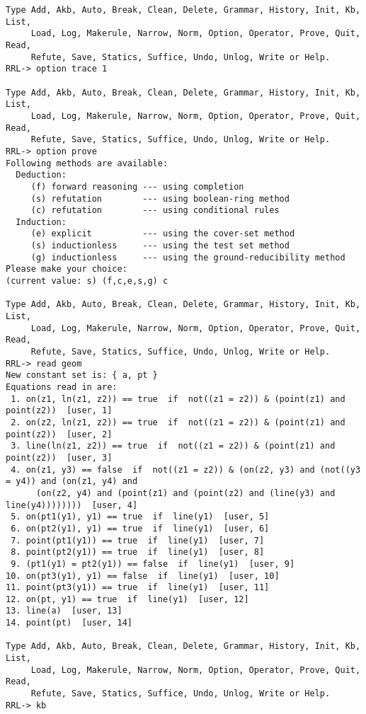 \begin{verbatim}
Type Add, Akb, Auto, Break, Clean, Delete, Grammar, History, Init, Kb, List,
     Load, Log, Makerule, Narrow, Norm, Option, Operator, Prove, Quit, Read,
     Refute, Save, Statics, Suffice, Undo, Unlog, Write or Help.
RRL-> option trace 1

Type Add, Akb, Auto, Break, Clean, Delete, Grammar, History, Init, Kb, List,
     Load, Log, Makerule, Narrow, Norm, Option, Operator, Prove, Quit, Read,
     Refute, Save, Statics, Suffice, Undo, Unlog, Write or Help.
RRL-> option prove 
Following methods are available:
  Deduction:
     (f) forward reasoning --- using completion
     (s) refutation        --- using boolean-ring method
     (c) refutation        --- using conditional rules
  Induction:
     (e) explicit          --- using the cover-set method
     (s) inductionless     --- using the test set method
     (g) inductionless     --- using the ground-reducibility method
Please make your choice: 
(current value: s) (f,c,e,s,g) c

Type Add, Akb, Auto, Break, Clean, Delete, Grammar, History, Init, Kb, List,
     Load, Log, Makerule, Narrow, Norm, Option, Operator, Prove, Quit, Read,
     Refute, Save, Statics, Suffice, Undo, Unlog, Write or Help.
RRL-> read geom
New constant set is: { a, pt }
Equations read in are:
 1. on(z1, ln(z1, z2)) == true  if  not((z1 = z2)) & (point(z1) and point(z2))  [user, 1]
 2. on(z2, ln(z1, z2)) == true  if  not((z1 = z2)) & (point(z1) and point(z2))  [user, 2]
 3. line(ln(z1, z2)) == true  if  not((z1 = z2)) & (point(z1) and point(z2))  [user, 3]
 4. on(z1, y3) == false  if  not((z1 = z2)) & (on(z2, y3) and (not((y3 = y4)) and (on(z1, y4) and 
      (on(z2, y4) and (point(z1) and (point(z2) and (line(y3) and line(y4))))))))  [user, 4]
 5. on(pt1(y1), y1) == true  if  line(y1)  [user, 5]
 6. on(pt2(y1), y1) == true  if  line(y1)  [user, 6]
 7. point(pt1(y1)) == true  if  line(y1)  [user, 7]
 8. point(pt2(y1)) == true  if  line(y1)  [user, 8]
 9. (pt1(y1) = pt2(y1)) == false  if  line(y1)  [user, 9]
10. on(pt3(y1), y1) == false  if  line(y1)  [user, 10]
11. point(pt3(y1)) == true  if  line(y1)  [user, 11]
12. on(pt, y1) == true  if  line(y1)  [user, 12]
13. line(a)  [user, 13]
14. point(pt)  [user, 14]

Type Add, Akb, Auto, Break, Clean, Delete, Grammar, History, Init, Kb, List,
     Load, Log, Makerule, Narrow, Norm, Option, Operator, Prove, Quit, Read,
     Refute, Save, Statics, Suffice, Undo, Unlog, Write or Help.
RRL-> kb


\end{verbatim}
